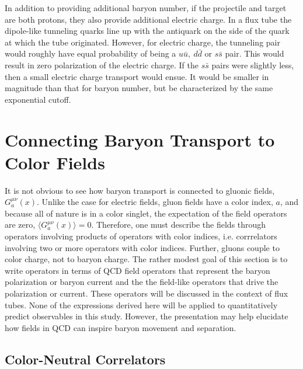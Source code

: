 \documentclass[aps, prc, 12pt, nofootinbib, showpacs, superscriptaddress, tightenlines, groupedaddress]{revtex4-2}
\begin{document}
In addition to providing additional baryon number, if the projectile and target are both protons, they also provide additional electric charge. In a flux tube the dipole-like tunneling quarks line up with the antiquark on the side of the quark at which the tube originated. However, for electric charge, the tunneling pair would roughly have equal probability of being a $u\bar{u},~d\bar{d}$ or $s\bar{s}$ pair. This would result in zero polarization of the electric charge. If the $s\bar{s}$ pairs were slightly less, then a small electric charge transport would ensue. It would be smaller in magnitude than that for baryon number, but be characterized by the same exponential cutoff. 

\section{Connecting Baryon Transport to Color Fields}\label{sec:kubo}

It is not obvious to see how baryon transport is connected to gluonic fields, $G^{\mu\nu}_a(x)$. Unlike the case for electric fields, gluon fields have a color index, $a$, and because all of nature is in a color singlet, the expectation of the field operators are zero, $\langle G^{\mu\nu}_a(x)\rangle=0$. Therefore, one must describe the fields through operators involving products of operators with color indices, i.e. corrrelators involving two or more operators with color indices. Further, gluons couple to color charge, not to baryon charge. The rather modest goal of this section is to write operators in terms of QCD field operators that represent the baryon polarization or baryon current and the the field-like operators that drive the polarization or current. These operators will be discussed in the context of flux tubes. None of the expressions derived here will be applied to quantitatively predict observables in this study. However, the presentation may help elucidate how fields in QCD can inspire baryon movement and separation.

\subsection{Color-Neutral Correlators}
\end{document}
